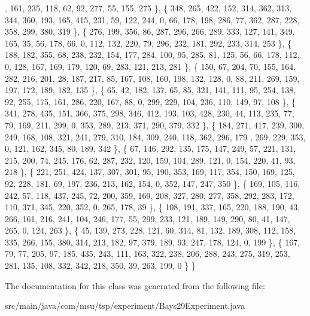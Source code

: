 \begin{DoxyCode}
      , 161, 235, 118, 62, 92, 277, 55, 155, 275 \},
            \{ 348, 265, 422, 152, 314, 362, 313, 344, 360, 193, 165, 415, 231, 59, 122, 244, 0, 66, 178, 
      198, 286, 77, 362, 287, 228, 358, 299, 380, 319 \},
            \{ 276, 199, 356, 86, 287, 296, 266, 289, 333, 127, 141, 349, 165, 35, 56, 178, 66, 0, 112, 132,
       220, 79, 296, 232, 181, 292, 233, 314, 253 \},
            \{ 188, 182, 355, 68, 238, 232, 154, 177, 284, 100, 95, 285, 81, 125, 56, 66, 178, 112, 0, 128, 
      167, 169, 179, 120, 69, 283, 121, 213, 281 \},
            \{ 150, 67, 204, 70, 155, 164, 282, 216, 201, 28, 187, 217, 85, 167, 108, 160, 198, 132, 128, 0,
       88, 211, 269, 159, 197, 172, 189, 182, 135 \},
            \{ 65, 42, 182, 137, 65, 85, 321, 141, 111, 95, 254, 138, 92, 255, 175, 161, 286, 220, 167, 88, 
      0, 299, 229, 104, 236, 110, 149, 97, 108 \},
            \{ 341, 278, 435, 151, 366, 375, 298, 346, 412, 193, 103, 428, 230, 44, 113, 235, 77, 79, 169, 
      211, 299, 0, 353, 289, 213, 371, 290, 379, 332 \},
            \{ 184, 271, 417, 239, 300, 249, 168, 108, 321, 241, 279, 310, 184, 309, 240, 118, 362, 296, 179
      , 269, 229, 353, 0, 121, 162, 345, 80, 189, 342 \},
            \{ 67, 146, 292, 135, 175, 147, 249, 57, 221, 131, 215, 200, 74, 245, 176, 62, 287, 232, 120, 
      159, 104, 289, 121, 0, 154, 220, 41, 93, 218 \},
            \{ 221, 251, 424, 137, 307, 301, 95, 190, 353, 169, 117, 354, 150, 169, 125, 92, 228, 181, 69, 
      197, 236, 213, 162, 154, 0, 352, 147, 247, 350 \},
            \{ 169, 105, 116, 242, 57, 118, 437, 245, 72, 200, 359, 169, 208, 327, 280, 277, 358, 292, 283, 
      172, 110, 371, 345, 220, 352, 0, 265, 178, 39 \},
            \{ 108, 191, 337, 165, 220, 188, 190, 43, 266, 161, 216, 241, 104, 246, 177, 55, 299, 233, 121, 
      189, 149, 290, 80, 41, 147, 265, 0, 124, 263 \},
            \{ 45, 139, 273, 228, 121, 60, 314, 81, 132, 189, 308, 112, 158, 335, 266, 155, 380, 314, 213, 
      182, 97, 379, 189, 93, 247, 178, 124, 0, 199 \},
            \{ 167, 79, 77, 205, 97, 185, 435, 243, 111, 163, 322, 238, 206, 288, 243, 275, 319, 253, 281, 
      135, 108, 332, 342, 218, 350, 39, 263, 199, 0 \} \}
\end{DoxyCode}


The documentation for this class was generated from the following file\-:\begin{DoxyCompactItemize}
\item 
src/main/java/com/msu/tsp/experiment/Bays29\-Experiment.\-java\end{DoxyCompactItemize}
